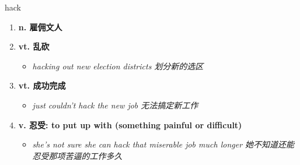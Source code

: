 
\begin{frame}
{\huge hack}
\begin{center}
\begin{enumerate}\Large
  \item \textbf{n. 雇佣文人}
  \item \textbf{vt. 乱砍}
  \begin{itemize}
    \item \em{\Large{hacking out new election districts 划分新的选区}}
  \end{itemize}
  \item \textbf{vt. 成功完成}
  \begin{itemize}
    \item \em{\Large{just couldn't hack the new job 无法搞定新工作}}
  \end{itemize}
  \item \textbf{v. 忍受: to put up with (something painful or difficult)}
  \begin{itemize}
    \item \em{\Large{she's not sure she can hack that miserable job much longer 她不知道还能忍受那项苦逼的工作多久}}
  \end{itemize}
\end{enumerate}
\end{center}
\end{frame}
